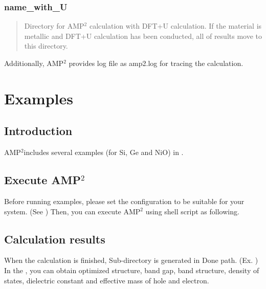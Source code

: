 \documentclass[letterpaper,10pt,english]{sphinxmanual}
\begin{document}
\subsection{name\_with\_U}
\label{\detokenize{Output/Output:name-with-u}}\begin{quote}

Directory for AMP$^{\text{2}}$ calculation with DFT+U calculation.
If the material is metallic and DFT+U calculation has been conducted,
all of results move to this directory.
\end{quote}

Additionally, AMP$^{\text{2}}$ provides log file as amp2.log for tracing the calculation.


\chapter{Examples}
\label{\detokenize{Examples/Examples:examples}}\label{\detokenize{Examples/Examples::doc}}

\section{Introduction}
\label{\detokenize{Examples/Examples:introduction}}
AMP$^{\text{2}}$includes several examples (for Si, Ge and NiO) in .


\section{Execute AMP$^{\text{2}}$}
\label{\detokenize{Examples/Examples:execute-amp2}}
Before running examples, please set the configuration to be suitable for your system.
(See {\hyperref[\detokenize{Installation/Installation::doc}]{}})
Then, you can execute AMP$^{\text{2}}$ using shell script as following.

\begin{sphinxVerbatim}[commandchars=\\\{\}]
 
\end{sphinxVerbatim}


\section{Calculation results}
\label{\detokenize{Examples/Examples:calculation-results}}
When the calculation is finished, Sub-directory is generated in Done path. (Ex. )
In the , you can obtain optimized structure, band gap, band structure, density of states,
dielectric constant and effective mass of hole and electron.
\end{document}
